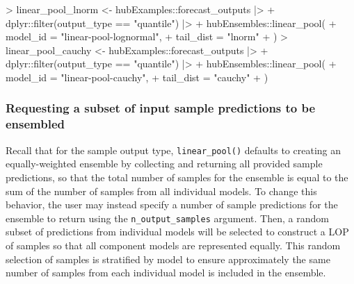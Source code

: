 \documentclass[
  letterpaper,
  DIV=11,
  numbers=noendperiod]{scrartcl}
\newenvironment{Shaded}{\begin{snugshade}}{\end{snugshade}}
\newcommand{\AttributeTok}[1]{\textcolor[rgb]{0.40,0.45,0.13}{#1}}
\newcommand{\FunctionTok}[1]{\textcolor[rgb]{0.28,0.35,0.67}{#1}}
\newcommand{\NormalTok}[1]{\textcolor[rgb]{0.00,0.23,0.31}{#1}}
\newcommand{\OtherTok}[1]{\textcolor[rgb]{0.00,0.23,0.31}{#1}}
\newcommand{\SpecialCharTok}[1]{\textcolor[rgb]{0.37,0.37,0.37}{#1}}
\newcommand{\StringTok}[1]{\textcolor[rgb]{0.13,0.47,0.30}{#1}}
\begin{document}
\begin{Shaded}
\begin{Highlighting}[]
\SpecialCharTok{\textgreater{}}\NormalTok{ linear\_pool\_lnorm }\OtherTok{\textless{}{-}}\NormalTok{ hubExamples}\SpecialCharTok{::}\NormalTok{forecast\_outputs }\SpecialCharTok{|\textgreater{}}
\SpecialCharTok{+}\NormalTok{   dplyr}\SpecialCharTok{::}\FunctionTok{filter}\NormalTok{(output\_type }\SpecialCharTok{==} \StringTok{"quantile"}\NormalTok{) }\SpecialCharTok{|\textgreater{}}
\SpecialCharTok{+}\NormalTok{   hubEnsembles}\SpecialCharTok{::}\FunctionTok{linear\_pool}\NormalTok{(}
\SpecialCharTok{+}     \AttributeTok{model\_id =} \StringTok{"linear{-}pool{-}lognormal"}\NormalTok{,}
\SpecialCharTok{+}     \AttributeTok{tail\_dist =} \StringTok{"lnorm"}
\SpecialCharTok{+}\NormalTok{   )}
\SpecialCharTok{\textgreater{}}\NormalTok{ linear\_pool\_cauchy }\OtherTok{\textless{}{-}}\NormalTok{ hubExamples}\SpecialCharTok{::}\NormalTok{forecast\_outputs }\SpecialCharTok{|\textgreater{}}
\SpecialCharTok{+}\NormalTok{   dplyr}\SpecialCharTok{::}\FunctionTok{filter}\NormalTok{(output\_type }\SpecialCharTok{==} \StringTok{"quantile"}\NormalTok{) }\SpecialCharTok{|\textgreater{}}
\SpecialCharTok{+}\NormalTok{   hubEnsembles}\SpecialCharTok{::}\FunctionTok{linear\_pool}\NormalTok{(}
\SpecialCharTok{+}     \AttributeTok{model\_id =} \StringTok{"linear{-}pool{-}cauchy"}\NormalTok{,}
\SpecialCharTok{+}     \AttributeTok{tail\_dist =} \StringTok{"cauchy"}
\SpecialCharTok{+}\NormalTok{   )}
\end{Highlighting}
\end{Shaded}

\subsubsection{Requesting a subset of input sample predictions to be
ensembled}\label{requesting-a-subset-of-input-sample-predictions-to-be-ensembled}

Recall that for the sample output type, \texttt{linear\_pool()} defaults
to creating an equally-weighted ensemble by collecting and returning all
provided sample predictions, so that the total number of samples for the
ensemble is equal to the sum of the number of samples from all
individual models. To change this behavior, the user may instead specify
a number of sample predictions for the ensemble to return using the
\texttt{n\_output\_samples} argument. Then, a random subset of
predictions from individual models will be selected to construct a LOP
of samples so that all component models are represented equally. This
random selection of samples is stratified by model to ensure
approximately the same number of samples from each individual model is
included in the ensemble.
\end{document}
